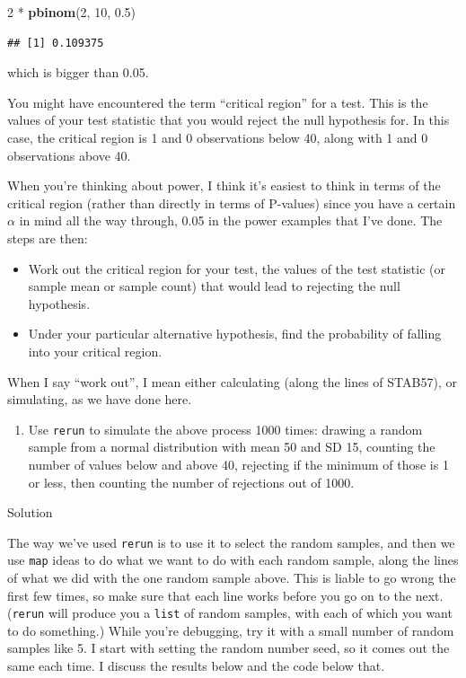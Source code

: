 \documentclass[]{tufte-book}
\newenvironment{Shaded}{}{}
\newcommand{\DecValTok}[1]{\textcolor[rgb]{0.25,0.63,0.44}{#1}}
\newcommand{\FloatTok}[1]{\textcolor[rgb]{0.25,0.63,0.44}{#1}}
\newcommand{\KeywordTok}[1]{\textcolor[rgb]{0.00,0.44,0.13}{\textbf{#1}}}
\newcommand{\NormalTok}[1]{#1}
\newcommand{\OperatorTok}[1]{\textcolor[rgb]{0.40,0.40,0.40}{#1}}
\newcommand{\StringTok}[1]{\textcolor[rgb]{0.25,0.44,0.63}{#1}}
\providecommand{\tightlist}{%
  \setlength{\itemsep}{0pt}\setlength{\parskip}{0pt}}
\theoremstyle{definition}
\theoremstyle{definition}
\theoremstyle{definition}
\theoremstyle{remark}
\begin{document}
\begin{Shaded}
\begin{Highlighting}[]
\DecValTok{2} \OperatorTok{*}\StringTok{ }\KeywordTok{pbinom}\NormalTok{(}\DecValTok{2}\NormalTok{, }\DecValTok{10}\NormalTok{, }\FloatTok{0.5}\NormalTok{)}
\end{Highlighting}
\end{Shaded}

\begin{verbatim}
## [1] 0.109375
\end{verbatim}

which is bigger than 0.05.

You might have encountered the term ``critical region'' for a test. This
is the values of your test statistic that you would reject the null
hypothesis for. In this case, the critical region is 1 and 0
observations below 40, along with 1 and 0 observations above 40.

When you're thinking about power, I think it's easiest to think in terms
of the critical region (rather than directly in terms of P-values) since
you have a certain \(\alpha\) in mind all the way through, 0.05 in the
power examples that I've done. The steps are then:

\begin{itemize}
\item
  Work out the critical region for your test, the values of the test
  statistic (or sample mean or sample count) that would lead to
  rejecting the null hypothesis.
\item
  Under your particular alternative hypothesis, find the probability of
  falling into your critical region.
\end{itemize}

When I say ``work out'', I mean either calculating (along the lines of
STAB57), or simulating, as we have done here.

\begin{enumerate}
\def\labelenumi{(\alph{enumi})}
\setcounter{enumi}{4}
\tightlist
\item
  Use \texttt{rerun} to simulate the above process 1000 times: drawing a
  random sample from a normal distribution with mean 50 and SD 15,
  counting the number of values below and above 40, rejecting if the
  minimum of those is 1 or less, then counting the number of rejections
  out of 1000.
\end{enumerate}

Solution

The way we've used \texttt{rerun} is to use it to select the random
samples, and then we use \texttt{map} ideas to do what we want to do
with each random sample, along the lines of what we did with the one
random sample above. This is liable to go wrong the first few times, so
make sure that each line works before you go on to the next.
(\texttt{rerun} will produce you a \texttt{list} of random samples, with
each of which you want to do something.) While you're debugging, try it
with a small number of random samples like 5. I start with setting the
random number seed, so it comes out the same each time. I discuss the
results below and the code below that.
\end{document}
